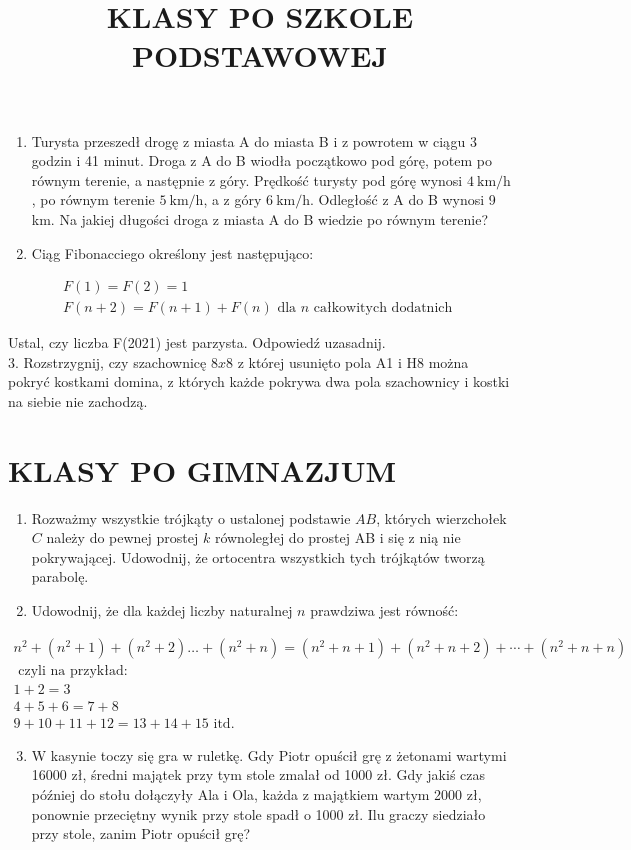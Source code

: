\documentclass[10pt]{article}
\title{KLASY PO SZKOLE PODSTAWOWEJ }
\author{}
\date{}
\begin{document}
\maketitle
\begin{enumerate}
  \item Turysta przeszedł drogę z miasta A do miasta B i z powrotem w ciągu 3 godzin i 41 minut. Droga z A do B wiodła początkowo pod górę, potem po równym terenie, a następnie z góry. Prędkość turysty pod górę wynosi \(4 \mathrm{~km} / \mathrm{h}\), po równym terenie \(5 \mathrm{~km} / \mathrm{h}\), a z góry \(6 \mathrm{~km} / \mathrm{h}\). Odległość z A do B wynosi 9 km. Na jakiej długości droga z miasta A do B wiedzie po równym terenie?
  \item Ciąg Fibonacciego określony jest następująco:
\end{enumerate}

\[
\begin{gathered}
F(1)=F(2)=1 \\
F(n+2)=F(n+1)+F(n) \text { dla } n \text { całkowitych dodatnich }
\end{gathered}
\]

Ustal, czy liczba F(2021) jest parzysta. Odpowiedź uzasadnij.\\
3. Rozstrzygnij, czy szachownicę \(8 x 8\) z której usunięto pola A1 i H8 można pokryć kostkami domina, z których każde pokrywa dwa pola szachownicy i kostki na siebie nie zachodzą.

\section*{KLASY PO GIMNAZJUM}
\begin{enumerate}
  \item Rozważmy wszystkie trójkąty o ustalonej podstawie \(A B\), których wierzchołek \(C\) należy do pewnej prostej \(k\) równoległej do prostej AB i się z nią nie pokrywającej. Udowodnij, że ortocentra wszystkich tych trójkątów tworzą parabolę.
  \item Udowodnij, że dla każdej liczby naturalnej \(n\) prawdziwa jest równość:
\end{enumerate}

\[
\begin{gathered}
n^{2}+\left(n^{2}+1\right)+\left(n^{2}+2\right) \ldots+\left(n^{2}+n\right)=\left(n^{2}+n+1\right)+\left(n^{2}+n+2\right)+\cdots+\left(n^{2}+n+n\right) \\
\text { czyli na przykład: } \\
1+2=3 \\
4+5+6=7+8 \\
9+10+11+12=13+14+15 \text { itd. }
\end{gathered}
\]

\begin{enumerate}
  \setcounter{enumi}{2}
  \item W kasynie toczy się gra w ruletkę. Gdy Piotr opuścił grę z żetonami wartymi 16000 zł, średni majątek przy tym stole zmalał od 1000 zł. Gdy jakiś czas później do stołu dołączyły Ala i Ola, każda z majątkiem wartym 2000 zł, ponownie przeciętny wynik przy stole spadł o 1000 zł. Ilu graczy siedziało przy stole, zanim Piotr opuścił grę?
\end{enumerate}
\end{document}
